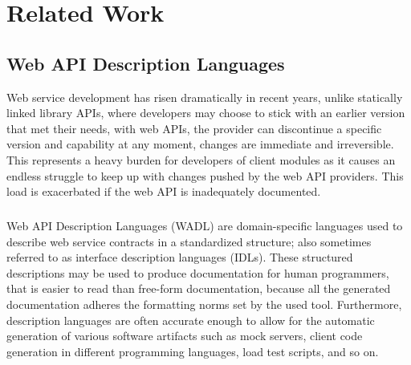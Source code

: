 
%

\chapter{Related Work}
\label{cha:related_work}

\section{Web API Description Languages} %
\label{sec:web_api_description_languages}

Web service development has risen dramatically in recent years,  unlike statically linked library APIs,
where developers may choose to stick with an earlier version that met their needs, with web APIs,
the provider can discontinue a specific version and capability at any moment, changes are immediate and irreversible.
This represents a heavy burden for developers of client modules as it causes an endless struggle to keep up
with changes pushed by the web API providers.
This load is exacerbated if the web API is inadequately documented.

\paragraph{}

Web API Description Languages (WADL) are domain-specific languages used to describe web service contracts in a standardized structure;
also sometimes referred to as interface description languages (IDLs).
These structured descriptions may be used to produce documentation for human programmers, that is easier to read than free-form documentation,
because all the generated documentation adheres the formatting norms set by the used tool.
Furthermore, description languages are often accurate enough to allow for the automatic generation of various software artifacts such as mock servers,
client code generation in different programming languages, load test scripts, and so on.

\paragraph{}

